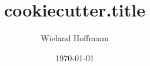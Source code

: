 \documentclass{beamer}
\title{ {{cookiecutter.title}} }
\author{Wieland Hoffmann}
\date{\today}
\begin{document}
\frame{
  \titlepage{}
}

\frame{
}

\frame{
}
\end{document}
